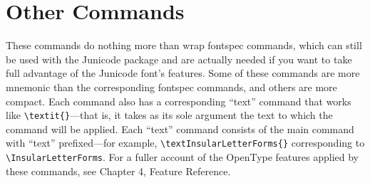 \documentclass{article}
\begin{document}
\section{Other Commands}

These commands do nothing more than wrap fontspec commands, which can still be
used with the Junicode package and are actually needed if you want to take full
advantage of the Junicode font’s features. Some of these commands are more mnemonic
than the corresponding fontspec commands, and others are more compact. Each command
also has a corresponding “text” command that works like 
{\small\verb|\textit{}|}—that is, it takes
as its sole argument the text to which the command will be applied. Each “text” command
consists of the main command with “text” prefixed—for example,
{\small\verb|\textInsularLetterForms{}|}
corresponding to {\small\verb|\InsularLetterForms|}.  For a fuller account of the OpenType features
applied by these commands, see Chapter 4, Feature Reference.
\end{document}
